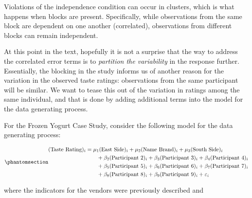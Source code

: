 \documentclass[
  letterpaper,
  DIV=11,
  numbers=noendperiod]{scrreprt}
\theoremstyle{plain}
\theoremstyle{definition}
\theoremstyle{definition}
\theoremstyle{remark}
\begin{document}
\begin{tcolorbox}[enhanced jigsaw, breakable, titlerule=0mm, colframe=quarto-callout-note-color-frame, bottomtitle=1mm, opacityback=0, rightrule=.15mm, toptitle=1mm, arc=.35mm, bottomrule=.15mm, left=2mm, title=\textcolor{quarto-callout-note-color}{\faInfo}\hspace{0.5em}{Note}, leftrule=.75mm, coltitle=black, toprule=.15mm, colbacktitle=quarto-callout-note-color!10!white, colback=white, opacitybacktitle=0.6]

Violations of the independence condition can occur in clusters, which is
what happens when blocks are present. Specifically, while observations
from the same block are dependent on one another (correlated),
observations from different blocks can remain independent.

\end{tcolorbox}

At this point in the text, hopefully it is not a surprise that the way
to address the correlated error terms is to \emph{partition the
variability} in the response further. Essentially, the blocking in the
study informs us of another reason for the variation in the observed
taste ratings: observations from the same participant will be similar.
We want to tease this out of the variation in ratings among the same
individual, and that is done by adding additional terms into the model
for the data generating process.

For the Frozen Yogurt Case Study, consider the following model for the
data generating process:

\begin{equation}\phantomsection\label{eq-blockmodel-model}{
\begin{aligned}
  (\text{Taste Rating})_i &= \mu_1 (\text{East Side})_i + \mu_2 (\text{Name Brand})_i + \mu_3 (\text{South Side})_i \\
    &\qquad + \beta_2 (\text{Participant 2})_i + \beta_3 (\text{Participant 3})_i + \beta_4 (\text{Participant 4})_i \\
    &\qquad + \beta_5 (\text{Participant 5})_i + \beta_6 (\text{Participant 6})_i + \beta_7 (\text{Participant 7})_i \\
    &\qquad + \beta_8 (\text{Participant 8})_i + \beta_9 (\text{Participant 9})_i + \varepsilon_i
\end{aligned}
}\end{equation}

where the indicators for the vendors were previously described and
\end{document}
